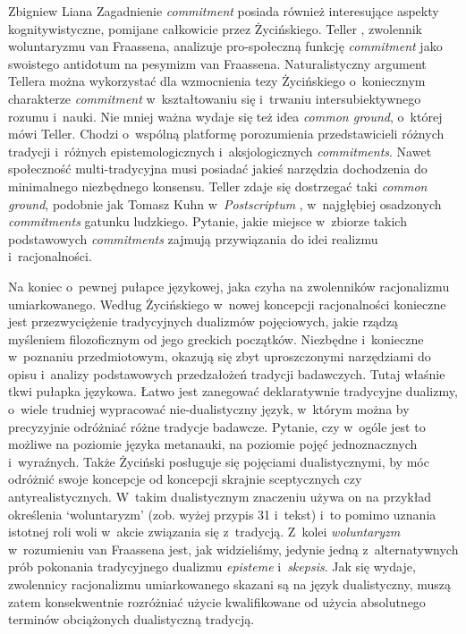 \begin{artplenv}{Zbigniew Liana}
Zagadnienie \textit{commitment} posiada również interesujące aspekty kognitywistyczne, pomijane całkowicie przez Życińskiego. Teller
\parencite*[][s.~65n]{teller_learning_2011}, %
 zwolennik woluntaryzmu van Fraassena, analizuje pro-społeczną funkcję \textit{commitment} jako swoistego antidotum na pesymizm van Fraassena. Naturalistyczny argument Tellera można wykorzystać dla wzmocnienia tezy Życińskiego o~koniecznym charakterze \textit{commitment} w~kształtowaniu się i~trwaniu intersubiektywnego rozumu i~nauki. Nie mniej ważna wydaje się też idea \textit{common ground}, o~której mówi Teller. Chodzi o~wspólną platformę porozumienia przedstawicieli różnych tradycji i~różnych epistemologicznych i~aksjologicznych \textit{commitments}. Nawet społeczność multi-tradycyjna musi posiadać jakieś narzędzia dochodzenia do minimalnego niezbędnego konsensu. Teller zdaje się dostrzegać taki \textit{common ground}, podobnie jak Tomasz Kuhn w~\textit{Postscriptum} 
\parencite*[][s.~346n]{kuhn_struktura_2001}, %
 w~najgłębiej osadzonych \textit{commitments} gatunku ludzkiego. Pytanie, jakie miejsce w~zbiorze takich podstawowych \textit{commitments} zajmują przywiązania do idei realizmu i~racjonalności.

Na koniec o~pewnej pułapce językowej, jaka czyha na zwolenników racjonalizmu umiarkowanego. Według Życińskiego w~nowej koncepcji racjonalności konieczne jest przezwyciężenie tradycyjnych dualizmów pojęciowych, jakie rządzą myśleniem filozoficznym od jego greckich początków. Niezbędne i~konieczne w~poznaniu przedmiotowym, okazują się zbyt uproszczonymi narzędziami do opisu i~analizy podstawowych przedzałożeń tradycji badawczych. Tutaj właśnie tkwi pułapka językowa. Łatwo jest zanegować deklaratywnie tradycyjne dualizmy, o~wiele trudniej wypracować nie-dualistyczny język, w~którym można by precyzyjnie odróżniać różne tradycje badawcze. Pytanie, czy w~ogóle jest to możliwe na poziomie języka metanauki, na poziomie pojęć jednoznacznych i~wyraźnych. Także Życiński posługuje się pojęciami dualistycznymi, by móc odróżnić swoje koncepcje od koncepcji skrajnie sceptycznych czy antyrealistycznych. W~takim dualistycznym znaczeniu używa on na przykład określenia ‘woluntaryzm' (zob. wyżej przypis 31 i~tekst) i~to pomimo uznania istotnej roli woli w~akcie związania się z~tradycją. Z~kolei \textit{woluntaryzm} w~rozumieniu van Fraassena jest, jak widzieliśmy, jedynie jedną z~alternatywnych prób pokonania tradycyjnego dualizmu \textit{episteme} i~\textit{skepsis}. Jak się wydaje, zwolennicy racjonalizmu umiarkowanego skazani są na język dualistyczny, muszą zatem konsekwentnie rozróżniać użycie kwalifikowane od użycia absolutnego terminów obciążonych dualistyczną tradycją.

\end{artplenv}